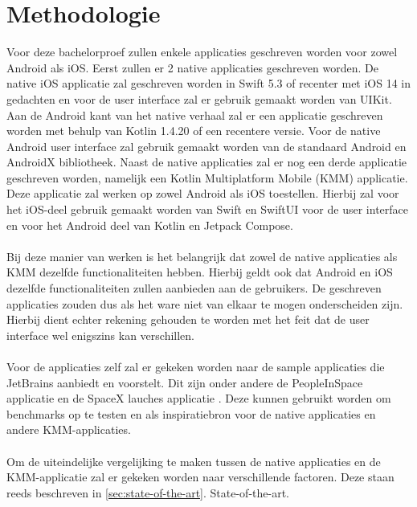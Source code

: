 \section{Methodologie}
\label{sec:methodologie}

Voor deze bachelorproef zullen enkele applicaties geschreven worden voor zowel Android als iOS. Eerst zullen er 2 native applicaties geschreven worden. De native iOS applicatie zal geschreven worden in Swift 5.3 of recenter met iOS 14 in gedachten en voor de user interface zal er gebruik gemaakt worden van UIKit. Aan de Android kant van het native verhaal zal er een applicatie geschreven worden met behulp van Kotlin 1.4.20 of een recentere versie. Voor de native Android user interface zal gebruik gemaakt worden van de standaard Android en AndroidX bibliotheek. Naast de native applicaties zal er nog een derde applicatie geschreven worden, namelijk een Kotlin Multiplatform Mobile (KMM) applicatie. Deze applicatie zal werken op zowel Android als iOS toestellen. Hierbij zal voor het iOS-deel gebruik gemaakt worden van Swift en SwiftUI voor de user interface en voor het Android deel van Kotlin en Jetpack Compose.
\\ \\
Bij deze manier van werken is het belangrijk dat zowel de native applicaties als KMM dezelfde functionaliteiten hebben. Hierbij geldt ook dat Android en iOS dezelfde functionaliteiten zullen aanbieden aan de gebruikers. De geschreven applicaties zouden dus als het ware niet van elkaar te mogen onderscheiden zijn. Hierbij dient echter rekening gehouden te worden met het feit dat de user interface wel enigszins kan verschillen.
\\ \\
Voor de applicaties zelf zal er gekeken worden naar de sample applicaties die JetBrains aanbiedt en voorstelt. Dit zijn onder andere de PeopleInSpace applicatie \autocite{OReilly2021} en de SpaceX lauches applicatie \autocite{Kotlin2020HandsOn}. Deze kunnen gebruikt worden om benchmarks op te testen en als inspiratiebron voor de native applicaties en andere KMM-applicaties.
\\ \\
Om de uiteindelijke vergelijking te maken tussen de native applicaties en de KMM-applicatie zal er gekeken worden naar verschillende factoren. Deze staan reeds beschreven in \ref{sec:state-of-the-art}. State-of-the-art.
\\ \\
